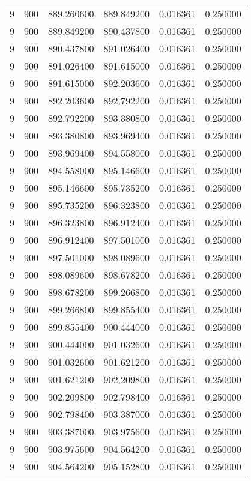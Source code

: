 \begin{longtable}{rrrrrr}
9 & 900 & 889.260600 & 889.849200 & 0.016361 & 0.250000 \\
9 & 900 & 889.849200 & 890.437800 & 0.016361 & 0.250000 \\
9 & 900 & 890.437800 & 891.026400 & 0.016361 & 0.250000 \\
9 & 900 & 891.026400 & 891.615000 & 0.016361 & 0.250000 \\
9 & 900 & 891.615000 & 892.203600 & 0.016361 & 0.250000 \\
9 & 900 & 892.203600 & 892.792200 & 0.016361 & 0.250000 \\
9 & 900 & 892.792200 & 893.380800 & 0.016361 & 0.250000 \\
9 & 900 & 893.380800 & 893.969400 & 0.016361 & 0.250000 \\
9 & 900 & 893.969400 & 894.558000 & 0.016361 & 0.250000 \\
9 & 900 & 894.558000 & 895.146600 & 0.016361 & 0.250000 \\
9 & 900 & 895.146600 & 895.735200 & 0.016361 & 0.250000 \\
9 & 900 & 895.735200 & 896.323800 & 0.016361 & 0.250000 \\
9 & 900 & 896.323800 & 896.912400 & 0.016361 & 0.250000 \\
9 & 900 & 896.912400 & 897.501000 & 0.016361 & 0.250000 \\
9 & 900 & 897.501000 & 898.089600 & 0.016361 & 0.250000 \\
9 & 900 & 898.089600 & 898.678200 & 0.016361 & 0.250000 \\
9 & 900 & 898.678200 & 899.266800 & 0.016361 & 0.250000 \\
9 & 900 & 899.266800 & 899.855400 & 0.016361 & 0.250000 \\
9 & 900 & 899.855400 & 900.444000 & 0.016361 & 0.250000 \\
9 & 900 & 900.444000 & 901.032600 & 0.016361 & 0.250000 \\
9 & 900 & 901.032600 & 901.621200 & 0.016361 & 0.250000 \\
9 & 900 & 901.621200 & 902.209800 & 0.016361 & 0.250000 \\
9 & 900 & 902.209800 & 902.798400 & 0.016361 & 0.250000 \\
9 & 900 & 902.798400 & 903.387000 & 0.016361 & 0.250000 \\
9 & 900 & 903.387000 & 903.975600 & 0.016361 & 0.250000 \\
9 & 900 & 903.975600 & 904.564200 & 0.016361 & 0.250000 \\
9 & 900 & 904.564200 & 905.152800 & 0.016361 & 0.250000 \\

\end{longtable}
